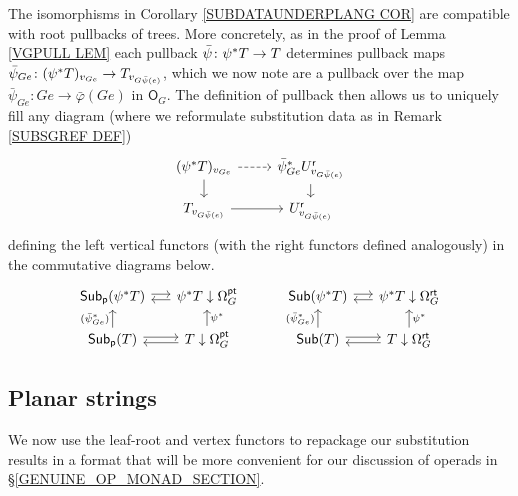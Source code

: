 \documentclass[a4paper,10pt]{article}%
\begin{document}
\begin{remark}\label{PULLCOMP REM}
	The isomorphisms in Corollary \ref{SUBDATAUNDERPLANG COR}
	are compatible with root pullbacks of trees. 
	More concretely, as in the proof of Lemma \ref{VGPULL LEM}
	each pullback 
	$\bar{\psi} \colon \psi^{\**} T \to T$
	determines pullback maps
	$\bar{\psi}_{G e} \colon
	(\psi^{\**} T)_{v_{Ge}} \to T_{v_{G \bar{\psi}(e)}}$,
	which we now note are a pullback over the map
	$\bar{\psi}_{G e} \colon Ge \to \bar{\varphi}(G e)$
	in $\mathsf{O}_G$. The definition of pullback then allows us to uniquely fill any diagram (where we reformulate substitution data as in Remark \ref{SUBSGREF DEF})
\[
\begin{tikzcd}[row sep =10pt]
	(\psi^{\**} T)_{v_{Ge}} \ar{d} \ar[dashed]{r} &
	\bar{\psi}_{G e}^{\**}U_{v_{G \bar{\psi}(e)}}^{\mathsf{r}} \ar{d}
\\
	T_{v_{G \bar{\psi}(e)}} \ar{r} &
	U_{v_{G \bar{\psi}(e)}}^{\mathsf{r}}
\end{tikzcd}	
\]
defining the left vertical functors (with the right functors defined analogously) in the commutative diagrams below.
\begin{equation}\label{SUBDATAUNDERPLANG2 EQ}
\begin{tikzcd}[row sep =12pt,column sep= 14pt]
	\mathsf{Sub}_{\mathsf{p}}(\psi^{\**} T) \ar[r,shift left=2pt] &
	\psi^{\**} T \downarrow \Omega_{G}^{\mathsf{pt}} \ar[l,shift left=2pt] & &
	\mathsf{Sub}(\psi^{\**} T) \ar[r,shift left=2pt] &
	\psi^{\**} T \downarrow \Omega_{G}^{\mathsf{rt}} \ar[l,shift left=2pt]
\\
	\mathsf{Sub}_{\mathsf{p}}(T) \ar[r,shift left=2pt] \ar{u}{(\bar{\psi}_{Ge}^{\**})} &
	T \downarrow \Omega_{G}^{\mathsf{pt}} \ar[l,shift left=2pt] \ar{u}[swap]{\psi^{\**}} & &
	\mathsf{Sub}(T) \ar[r,shift left=2pt] \ar{u}{(\bar{\psi}_{Ge}^{\**})} &
	T \downarrow \Omega_{G}^{\mathsf{rt}} \ar[l,shift left=2pt] \ar{u}[swap]{\psi^{\**}}
\end{tikzcd}
\end{equation}
\end{remark}


\subsection{Planar strings}\label{PLANARSTRING SEC}

We now use the leaf-root and vertex functors to repackage 
our substitution results in a format that will be more convenient for our discussion of operads in 
\S \ref{GENUINE_OP_MONAD_SECTION}.
\end{document}
